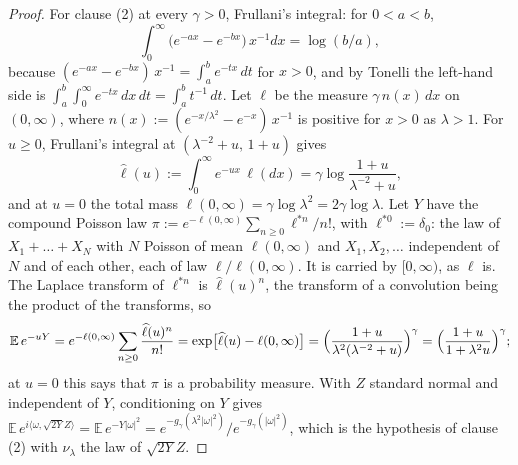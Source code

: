 \begin{proof}
For clause (2) at every $\gamma > 0$, Frullani's integral: for $0 < a < b$,
\[
  \int_0^\infty\bigl(e^{-ax} - e^{-bx}\bigr)\,x^{-1}dx = \log(b/a) ,
\]
because $(e^{-ax} - e^{-bx})\,x^{-1} = \int_a^b e^{-tx}\,dt$ for $x > 0$, and by Tonelli the
left-hand side is $\int_a^b\int_0^\infty e^{-tx}\,dx\,dt = \int_a^b t^{-1}\,dt$. Let $\ell$ be the
measure $\gamma\,n(x)\,dx$ on $(0,\infty)$, where $n(x) := (e^{-x/\lambda^2} - e^{-x})\,x^{-1}$ is
positive for $x > 0$ as $\lambda > 1$. For $u \ge 0$, Frullani's integral at
$(\lambda^{-2} + u,\, 1 + u)$ gives
\[
  \widehat\ell(u) := \int_0^\infty e^{-ux}\,\ell(dx) = \gamma\log\frac{1+u}{\lambda^{-2}+u} ,
\]
and at $u = 0$ the total mass $\ell(0,\infty) = \gamma\log\lambda^2 = 2\gamma\log\lambda$. Let $Y$ have
the compound Poisson law $\pi := e^{-\ell(0,\infty)}\sum_{n \ge 0}\ell^{*n}/n!$, with
$\ell^{*0} := \delta_0$: the law of $X_1 + \dots + X_N$ with $N$ Poisson of mean $\ell(0,\infty)$ and
$X_1, X_2, \dots$ independent of $N$ and of each other, each of law $\ell/\ell(0,\infty)$. It is
carried by $[0,\infty)$, as $\ell$ is. The Laplace transform of $\ell^{*n}$ is $\widehat\ell(u)^n$,
the transform of a convolution being the product of the transforms, so
\[
  \mathbb{E}\,e^{-uY} = e^{-\ell(0,\infty)}\sum_{n \ge 0}\frac{\widehat\ell(u)^n}{n!}
  = \exp\bigl[\widehat\ell(u) - \ell(0,\infty)\bigr]
  = \Bigl(\frac{1+u}{\lambda^2(\lambda^{-2}+u)}\Bigr)^\gamma
  = \Bigl(\frac{1+u}{1+\lambda^2u}\Bigr)^\gamma ;
\]
at $u = 0$ this says that $\pi$ is a probability measure.
With $Z$ standard normal and independent of $Y$, conditioning on $Y$ gives
$\mathbb{E}\,e^{i\langle\omega,\sqrt{2Y}Z\rangle} = \mathbb{E}\,e^{-Y|\omega|^2}
= e^{-g_\gamma(\lambda^2|\omega|^2)}/e^{-g_\gamma(|\omega|^2)}$, which is the hypothesis of clause (2)
with $\nu_\lambda$ the law of $\sqrt{2Y}Z$.
\end{proof}

